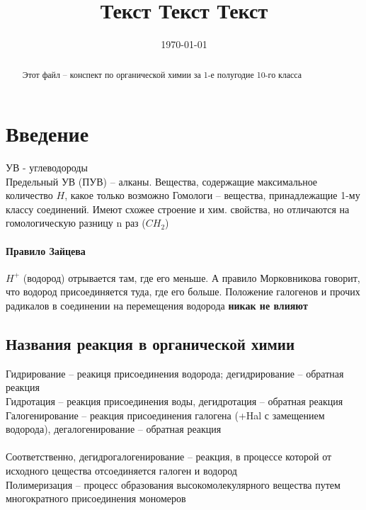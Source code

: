 \documentclass[a4paper]{article}
\title{Текст Текст Текст}
\date{\today}
\begin{document}
\maketitle
\tableofcontents
\begin{abstract}
Этот файл -- конспект по органической химии за 1-е полугодие 10-го класса
\end{abstract}
\section{Введение}
УВ - углеводороды\\
Предельный УВ (ПУВ) -- алканы. Вещества, содержащие максимальное
количество $H$, какое только возможно
Гомологи -- вещества, принадлежащие 1-му классу соединений. Имеют схожее
строение и хим. свойства, но отличаются на гомологическую разницу n раз
($CH_{2}$)\\
\paragraph{Правило Зайцева}
$H^{+}$ (водород) отрывается там, где его меньше. А правило Морковникова
говорит, что водород присоединяется туда, где его больше. Положение
галогенов и прочих радикалов в соединении на перемещения водорода
\textbf{никак не влияют}
\subsection{Названия реакция в органической химии}
Гидрирование -- реакиця присоединения водорода; дегидрирование -- обратная
реакция\\
Гидротация -- реакция присоединения воды, дегидротация -- обратная реакция\\
Галогенирование -- реакция присоединения галогена (+Hal с замещением водорода),
дегалогенирование -- обратная реакция\\\\
Соответственно, дегидрогалогенирование -- реакция, в процессе которой от
исходного цещества отсоединяется галоген и водород\\
Полимеризация -- процесс образования высокомолекулярного вещества путем
многократного присоединения мономеров\\
\end{document}
